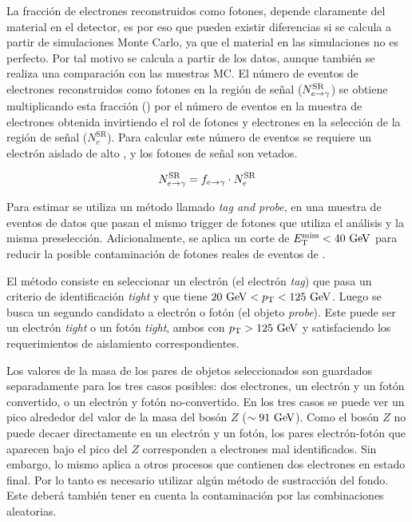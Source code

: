 La fracción de electrones reconstruidos como fotones, depende claramente del
material en el detector, es por eso que pueden existir diferencias si se calcula
a partir de simulaciones Monte Carlo, ya que el material en las simulaciones no
es perfecto. Por tal motivo se calcula a partir de los datos, aunque también se
realiza una comparación con las muestras MC.
El número de eventos de electrones reconstruidos como fotones en la región de
señal ($N_{e\rightarrow\gamma}^{\mathrm{SR}}$) se obtiene multiplicando esta fracción (\feg)
por el número de eventos en la muestra de electrones
obtenida invirtiendo el rol de fotones y electrones en la selección de la región
de señal ($N_e^{\mathrm{SR}}$). Para calcular este número de eventos se requiere
un electrón aislado de alto {\pt}, y los fotones de señal son
vetados.

\begin{equation}
  N_{e\rightarrow\gamma}^{\mathrm{SR}} = f_{e\rightarrow\gamma} \cdot N_e^{\mathrm{SR}}
\end{equation}

Para estimar {\feg} se utiliza un método llamado \emph{tag and probe}, en una muestra
de eventos de datos {\Zee} que pasan el mismo trigger de fotones que utiliza el
análisis y la misma preselección. Adicionalmente, se
aplica un corte de $\met < 40 \gev$ para reducir la posible contaminación de
fotones reales de eventos de {\wgam}.

El método consiste en seleccionar un electrón (el electrón \emph{tag}) que
pasa un criterio de identificación \emph{tight} y que tiene $20
\gev < \pt < 125 \gev$. Luego se busca un segundo candidato a electrón o fotón
(el objeto \emph{probe}). Este puede ser un electrón \emph{tight} o un fotón
\emph{tight}, ambos con $\pt > 125\gev$ y satisfaciendo los requerimientos de
aislamiento correspondientes.

Los valores de la masa de los pares de objetos seleccionados son guardados
separadamente para los tres casos posibles: dos electrones, un electrón y un
fotón convertido, o un electrón y fotón no-convertido. En los tres casos se
puede ver un pico alrededor del valor de la masa del bosón $Z$ ($\sim 91
\gev$).
Como el bosón $Z$ no puede decaer directamente en un electrón y un fotón, los
pares electrón-fotón que aparecen bajo el pico del $Z$ corresponden a electrones
mal identificados. Sin embargo, lo mismo aplica a otros procesos que contienen
dos electrones en estado final.
Por lo tanto es necesario utilizar algún método de
sustracción del fondo. Este deberá también tener en cuenta la contaminación por
las combinaciones aleatorias.

